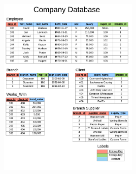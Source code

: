 \documentclass[8pt, a4paper, oneside, twocolumn]{extarticle}
\begin{document}
\includegraphics[width=0.5\textwidth,height=0.5\textheight,keepaspectratio]{company-database}
\end{document}
